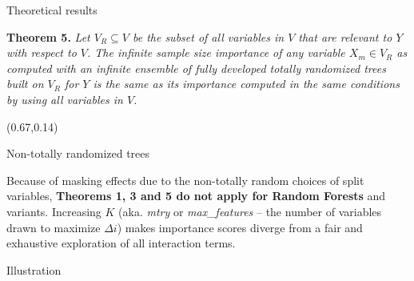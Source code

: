 \documentclass[final]{beamer}
\newcommand{\xmark}{\ding{55}}%
\begin{document}
\begin{frame}{}
\begin{textblock}{0.32}
\begin{block}{Theoretical results \phantom{p}}
\begin{shaded}
\vspace{0.3cm}

\textbf{Theorem 5.}
\textit{Let $V_R \subseteq V$ be the subset of all variables in $V$ that are relevant to $Y$ with
respect to $V$. The infinite sample size importance of any variable $X_m \in
V_R$ as computed with an infinite ensemble of fully developed totally randomized
trees built on $V_R$ for $Y$ is the same as its importance computed in the same conditions by using all variables in $V$.}
\end{shaded}

\end{block}

\end{textblock}



\begin{textblock}{0.32}(0.67,0.14)

\begin{block}{Non-totally randomized trees \phantom{p}}

{\color{red} \xmark} Because of masking effects due to the non-totally random
choices of split variables, \textbf{Theorems 1, 3 and 5 do not apply for Random Forests}
and variants. Increasing $K$ (aka. \textit{mtry} or \textit{max\_features} -- the number of variables drawn
to maximize $\Delta i$) makes importance scores diverge from a fair and
exhaustive exploration of all interaction terms.

\end{block}

\begin{block}{Illustration \phantom{p}}


\end{block}
\end{textblock}
\end{frame}
\end{document}
